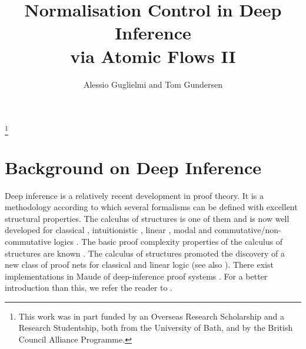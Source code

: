 \documentclass[a4paper]{amsart}
\theoremstyle{remark}
\theoremstyle{definition}
\begin{document}
\title[Normalisation Control in Deep Inference   via Atomic Flows II]
      {Normalisation Control in Deep Inference\\ via Atomic Flows II}

\author{Alessio Guglielmi and Tom Gundersen}

\thanks{This work was in part funded by an Overseas Research Scholarship and a Research Studentship, both from the University of Bath, and by the British Council Alliance Programme.}




\maketitle

\section{Background on Deep Inference}

Deep inference is a relatively recent development in proof theory. It is a methodology according to which several formalisms can be defined with excellent structural properties. The calculus of structures \cite{Gugl:06:A-System:kl} is one of them and is now well developed for classical \cite{Brun:03:Atomic-C:oz,Brun:06:Cut-Elim:cq,Brun:06:Locality:zh,BrunTiu:01:A-Local-:mz,Brun:06:Deep-Inf:qy}, intuitionistic \cite{Tiu:06:A-Local-:gf}, linear \cite{Stra:02:A-Local-:ul,Stra:03:MELL-in-:oy}, modal \cite{Brun::Deep-Seq:ay,GoreTiu:06:Classica:uq,Stou:06:A-Deep-I:rt} and commutative/non-commutative logics \cite{Gugl:06:A-System:kl,Tiu:06:A-System:ai,Stra:03:Linear-L:lp,Brus:02:A-Purely:wd,Di-G:04:Structur:wy,GuglStra:01:Non-comm:rp,GuglStra:02:A-Non-co:lq,GuglStra:02:A-Non-co:dq,Kahr:06:Reducing:hc,Kahr:07:System-B:fk}. The basic proof complexity properties of the calculus of structures are known \cite{BrusGugl:07:On-the-P:fk}. The calculus of structures promoted the discovery of a new class of proof nets for classical and linear logic \cite{LamaStra:05:Construc:qq,LamaStra:05:Naming-P:ov,LamaStra:06:From-Pro:et,StraLama:04:On-Proof:ec} (see also \cite{Guir:06:The-Thre:qt}). There exist implementations in Maude of deep-inference proof systems \cite{Kahr:07:Maude-as:lr}. For a better introduction than this, we refer the reader to \cite{Brun:03:Atomic-C:oz}.
\end{document}
